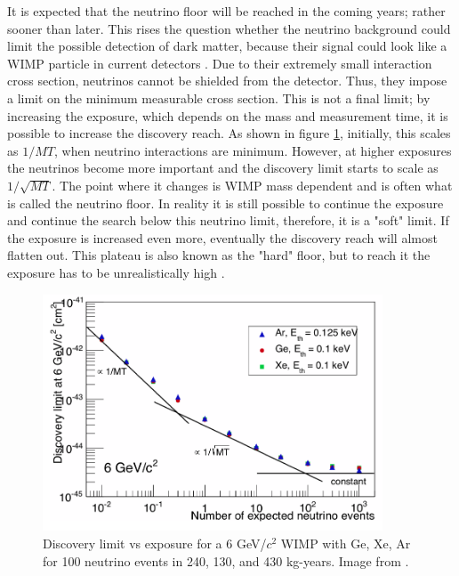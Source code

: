 \documentclass{article}
\begin{document}
It is expected that the neutrino floor will be reached in the coming years; rather sooner than later. This rises the question whether the neutrino background could limit the possible detection of dark matter, because their signal could look like a WIMP particle in current detectors \cite{Gutlein:2010tq,Billard:2013qya}. Due to their extremely small interaction cross section, neutrinos cannot be shielded from the detector. Thus, they impose a limit on the minimum measurable cross section. This is not a final limit; by increasing the exposure, which depends on the mass and measurement time, it is possible to increase the discovery reach. As shown in figure \ref{discovery_limit}, initially, this scales as $1/MT$, when neutrino interactions are minimum. However, at higher exposures the neutrinos become more important and the discovery limit starts to scale as $1/\sqrt{MT}$. The point where it changes is WIMP mass dependent and is often what is called the neutrino floor. In reality it is still possible to continue the exposure and continue the search below this neutrino limit, therefore, it is a "soft" limit. If the exposure is increased even more, eventually the discovery reach will almost flatten out. This plateau is also known as the "hard" floor, but to reach it the exposure has to be unrealistically high \cite{Wyenberg:2018eyv}. 

\begin{figure}[h!]
    \centering
    \includegraphics[width=0.9\textwidth]{Discovery_limit.png}
    \caption{Discovery limit vs exposure for a 6 GeV/$c^2$ WIMP with Ge, Xe, Ar for 100 neutrino events in 240, 130, and 430 kg-years. Image from \cite{Billard:2013qya}.}
    \label{discovery_limit}
\end{figure}
\end{document}
